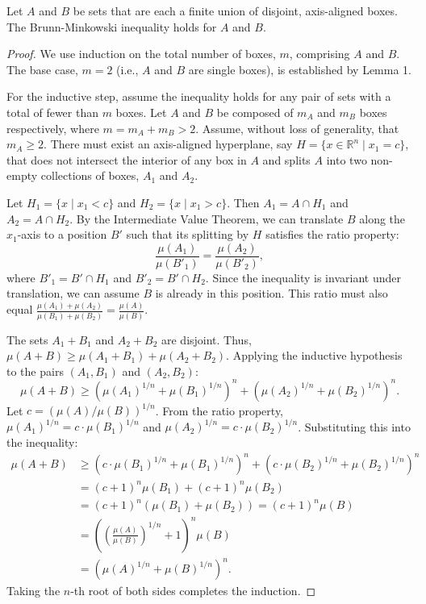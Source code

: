 \begin{lemma}
Let $A$ and $B$ be sets that are each a finite union of disjoint, axis-aligned boxes. The Brunn-Minkowski inequality holds for $A$ and $B$.
\end{lemma}

\begin{proof}
We use induction on the total number of boxes, $m$, comprising $A$ and $B$. The base case, $m=2$ (i.e., $A$ and $B$ are single boxes), is established by Lemma 1.

For the inductive step, assume the inequality holds for any pair of sets with a total of fewer than $m$ boxes. Let $A$ and $B$ be composed of $m_A$ and $m_B$ boxes respectively, where $m = m_A + m_B > 2$. Assume, without loss of generality, that $m_A \ge 2$. There must exist an axis-aligned hyperplane, say $H = \{x \in \mathbb{R}^n \mid x_1 = c\}$, that does not intersect the interior of any box in $A$ and splits $A$ into two non-empty collections of boxes, $A_1$ and $A_2$.

Let $H_1 = \{x \mid x_1 < c\}$ and $H_2 = \{x \mid x_1 > c\}$. Then $A_1 = A \cap H_1$ and $A_2 = A \cap H_2$. By the Intermediate Value Theorem, we can translate $B$ along the $x_1$-axis to a position $B'$ such that its splitting by $H$ satisfies the ratio property:
$$\frac{\mu(A_1)}{\mu(B'_1)} = \frac{\mu(A_2)}{\mu(B'_2)},$$
where $B'_1 = B' \cap H_1$ and $B'_2 = B' \cap H_2$. Since the inequality is invariant under translation, we can assume $B$ is already in this position. This ratio must also equal $\frac{\mu(A_1)+\mu(A_2)}{\mu(B_1)+\mu(B_2)} = \frac{\mu(A)}{\mu(B)}$.

The sets $A_1+B_1$ and $A_2+B_2$ are disjoint. Thus, $\mu(A+B) \ge \mu(A_1+B_1) + \mu(A_2+B_2)$. Applying the inductive hypothesis to the pairs $(A_1, B_1)$ and $(A_2, B_2)$:
$$\mu(A+B) \ge (\mu(A_1)^{1/n} + \mu(B_1)^{1/n})^n + (\mu(A_2)^{1/n} + \mu(B_2)^{1/n})^n.$$
Let $c = (\mu(A)/\mu(B))^{1/n}$. From the ratio property, $\mu(A_1)^{1/n} = c \cdot \mu(B_1)^{1/n}$ and $\mu(A_2)^{1/n} = c \cdot \mu(B_2)^{1/n}$. Substituting this into the inequality:
\begin{align*}
\mu(A+B) &\ge (c \cdot \mu(B_1)^{1/n} + \mu(B_1)^{1/n})^n + (c \cdot \mu(B_2)^{1/n} + \mu(B_2)^{1/n})^n \\
&= (c+1)^n \mu(B_1) + (c+1)^n \mu(B_2) \\
&= (c+1)^n (\mu(B_1) + \mu(B_2)) = (c+1)^n \mu(B) \\
&= \left( \left(\frac{\mu(A)}{\mu(B)}\right)^{1/n} + 1 \right)^n \mu(B) \\
&= (\mu(A)^{1/n} + \mu(B)^{1/n})^n.
\end{align*}
Taking the $n$-th root of both sides completes the induction.
\end{proof}

